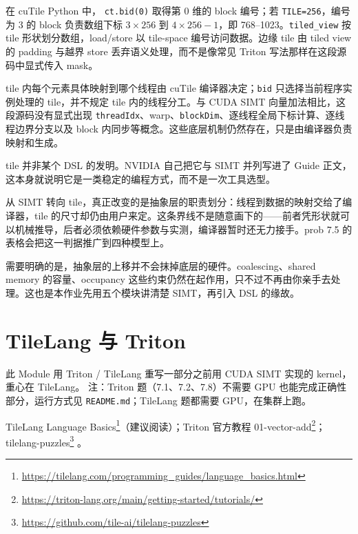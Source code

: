 \documentclass[11pt,a4paper,fontset=none]{ctexart}
\begin{document}
\begin{tcolorbox}[title={6.2--6.3 作答（讨论后整理）}]
在 cuTile Python 中，
\texttt{ct.bid(0)} 取得第 0 维的 block 编号；若 \texttt{TILE=256}，编号为 3 的 block 负责数组下标 $3\times256$ 到 $4\times256-1$，即 768--1023。\texttt{tiled\_view} 按 tile 形状划分数组，load/store 以 tile-space 编号访问数据。边缘 tile 由 tiled view 的 padding 与越界 store 丢弃语义处理，而不是像常见 Triton 写法那样在这段源码中显式传入 mask。

tile 内每个元素具体映射到哪个线程由 cuTile 编译器决定；\texttt{bid} 只选择当前程序实例处理的 tile，并不规定 tile 内的线程分工。与 CUDA SIMT 向量加法相比，这段源码没有显式出现 \texttt{threadIdx}、warp、\texttt{blockDim}、逐线程全局下标计算、逐线程边界分支以及 block 内同步等概念。这些底层机制仍然存在，只是由编译器负责映射和生成。
\end{tcolorbox}

\begin{lookback}
tile 并非某个 DSL 的发明。NVIDIA 自己把它与 SIMT 并列写进了 Guide 正文，这本身就说明它是一类稳定的编程方式，而不是一次工具选型。

从 SIMT 转向 tile，真正改变的是抽象层的职责划分：线程到数据的映射交给了编译器，tile 的尺寸却仍由用户来定。这条界线不是随意画下的——前者凭形状就可以机械推导，后者必须依赖硬件参数与实测，编译器暂时还无力接手。prob 7.5 的表格会把这一判据推广到四种模型上。

需要明确的是，抽象层的上移并不会抹掉底层的硬件。coalescing、shared memory 的容量、occupancy 这些约束仍然在起作用，只不过不再由你亲手去处理。这也是本作业先用五个模块讲清楚 SIMT，再引入 DSL 的缘故。
\end{lookback}

\section{TileLang 与 Triton}

此 Module 用 Triton / TileLang 重写一部分之前用 CUDA SIMT 实现的 kernel，重心在 TileLang。
注：Triton 题（7.1、7.2、7.8）不需要 GPU 也能完成正确性部分，运行方式见 \texttt{README.md}；TileLang 题都需要 GPU，在集群上跑。

\begin{reading}
TileLang Language Basics\footnote{\url{https://tilelang.com/programming_guides/language_basics.html}}（建议阅读）；Triton 官方教程 01-vector-add\footnote{\url{https://triton-lang.org/main/getting-started/tutorials/}}；tilelang-puzzles\footnote{\url{https://github.com/tile-ai/tilelang-puzzles}} 。
\end{reading}
\end{document}
